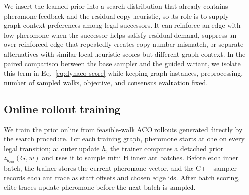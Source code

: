 \documentclass[11pt]{article}
\begin{document}
We insert the learned prior into a search distribution that already contains pheromone feedback and the residual-copy heuristic, so its role is to supply graph-context preferences among legal successors. It can reinforce an edge with low pheromone when the successor helps satisfy residual demand, suppress an over-reinforced edge that repeatedly creates copy-number mismatch, or separate alternatives with similar local heuristic scores but different graph context. In the paired comparison between the base sampler and the guided variant, we isolate this term in Eq.~\eqref{eq:dynaco-score} while keeping graph instances, preprocessing, number of sampled walks, objective, and consensus evaluation fixed.

\subsection{Online rollout training}

We train the prior online from feasible-walk ACO rollouts generated directly by the search procedure. For each training graph, pheromone starts at one on every legal transition; at outer update $h$, the trainer computes a detached prior $z_{\theta_{\mathrm{old}}}(G,w)$ and uses it to sample $\mathrm{mini\_H}$ inner ant batches. Before each inner batch, the trainer stores the current pheromone vector, and the C++ sampler records each ant trace as start offsets and chosen edge ids. After batch scoring, elite traces update pheromone before the next batch is sampled.
\end{document}
